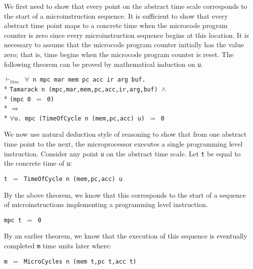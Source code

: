 \begin{normalsize}
We first need to show that every point on the abstract
time scale corresponds to the start of a microinstruction sequence.
It is sufficient to show that every abstract time point maps to
a concrete time when the microcode program counter is zero since
every microinstruction sequence begins at this location.
It is necessary to assume that the microcode program counter
initially has the value zero; that is, time begins when the microcode
program counter is reset.
The following theorem can be proved by mathematical induction on \verb"u".

\hspace*{\fill}
\begin{minipage}{17cm}
$\vdash_{thm}$\verb" "$\forall$\verb" n mpc mar mem pc acc ir arg buf."\\*
\verb"Tamarack n (mpc,mar,mem,pc,acc,ir,arg,buf) "$\wedge$\\*
\verb"(mpc 0 "$=$\verb" 0)"\\*
$\Longrightarrow$\\*
$\forall$\verb"u. mpc (TimeOfCycle n (mem,pc,acc) u) "$=$\verb" 0"
\end{minipage}
\hspace*{\fill}

We now use natural deduction style of
reasoning to show that from one abstract time point
to the next,
the microprocessor executes a single programming level instruction.
Consider any point \verb"u" on the abstract time scale.
Let \verb"t" be equal to the concrete time of \verb"u":

\hspace*{\fill}
\verb"t "$=$\verb" TimeOfCycle n (mem,pc,acc) u"
\hspace*{\fill}

By the above theorem, we know that
this corresponds to the start of a sequence of microinstructions
implementing a programming level instruction.

\hspace*{\fill}
\verb"mpc t "$=$\verb" 0"
\hspace*{\fill}

By an earlier theorem, we know that the execution of this
sequence is eventually completed \verb"m" time units later where:

\hspace*{\fill}
\verb"m "$=$\verb" MicroCycles n (mem t,pc t,acc t)"
\hspace*{\fill}


\end{normalsize}
